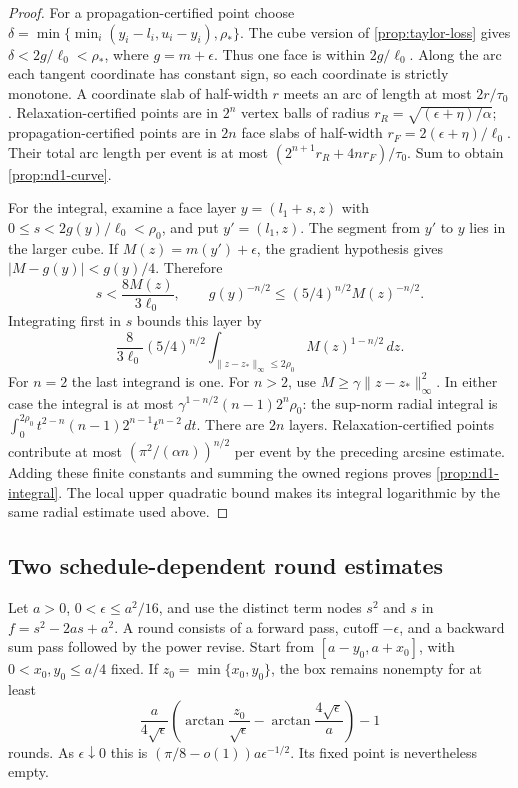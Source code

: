 \begin{proof}
For a propagation-certified point choose
$\delta=\min\{\min_i(y_i-l_i,u_i-y_i),\rho_*\}$. The cube version
of \eqref{prop:taylor-loss} gives
$\delta<2g/\ell_0<\rho_*$, where $g=m+\epsilon$.
Thus one face is within $2g/\ell_0$.
Along the arc each tangent coordinate has constant sign, so each
coordinate is strictly monotone. A coordinate slab of half-width $r$
meets an arc of length at most $2r/\tau_0$. Relaxation-certified points
are in $2^n$ vertex balls of radius
$r_R=\sqrt{(\epsilon+\eta)/\alpha}$; propagation-certified points are in
$2n$ face slabs of half-width $r_F=2(\epsilon+\eta)/\ell_0$.
Their total arc length per event is at most
$(2^{n+1}r_R+4nr_F)/\tau_0$. Sum to obtain \eqref{prop:nd1-curve}.

For the integral, examine a face layer $y=(l_1+s,z)$ with
$0\le s<2g(y)/\ell_0<\rho_0$, and put $y'=(l_1,z)$.
The segment from $y'$ to $y$ lies in the larger cube. If
$M(z)=m(y')+\epsilon$, the gradient hypothesis gives
$|M-g(y)|<g(y)/4$. Therefore
\[
 s<\frac{8M(z)}{3\ell_0},\qquad
 g(y)^{-n/2}\le(5/4)^{n/2}M(z)^{-n/2}.
\]
Integrating first in $s$ bounds this layer by
\[
 \frac8{3\ell_0}(5/4)^{n/2}
 \int_{\|z-z_*\|_\infty\le2\rho_0}M(z)^{1-n/2}\,dz.
\]
For $n=2$ the last integrand is one. For $n>2$, use
$M\ge\gamma\|z-z_*\|_\infty^2$. In either case the integral is at most
$\gamma^{1-n/2}(n-1)2^n\rho_0$: the sup-norm radial integral is
$\int_0^{2\rho_0}t^{2-n}(n-1)2^{n-1}t^{n-2}\,dt$.
There are $2n$ layers. Relaxation-certified points contribute at most
$(\pi^2/(\alpha n))^{n/2}$ per event by the preceding arcsine estimate.
Adding these finite constants and summing the owned regions proves
\eqref{prop:nd1-integral}. The local upper quadratic bound makes its
integral logarithmic by the same radial estimate used above.
\end{proof}

\subsection{Two schedule-dependent round estimates}
\label{app:propagation-rounds}

\begin{proposition}
\label{prop:slow-rounds}
Let $a>0$, $0<\epsilon\le a^2/16$, and use the distinct term nodes
$s^2$ and $s$ in $f=s^2-2as+a^2$. A round consists of a forward pass,
cutoff $-\epsilon$, and a backward sum pass followed by the power revise.
Start from $[a-y_0,a+x_0]$, with $0<x_0,y_0\le a/4$ fixed. If
$z_0=\min\{x_0,y_0\}$, the box remains nonempty for at least
\[
 \frac a{4\sqrt\epsilon}
 \left(\arctan\frac{z_0}{\sqrt\epsilon}
             -\arctan\frac{4\sqrt\epsilon}{a}\right)-1
\]
rounds. As $\epsilon\downarrow0$ this is
$(\pi/8-o(1))a\epsilon^{-1/2}$. Its fixed point is nevertheless empty.
\end{proposition}

